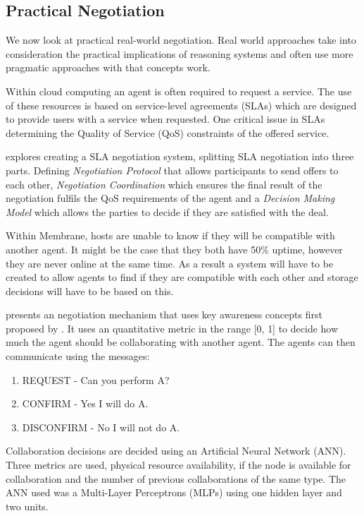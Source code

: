 \documentclass[11pt, a4paper, twoside]{report}
\begin{document}
\subsection{Practical Negotiation}

We now look at practical real-world negotiation. Real world approaches take into consideration the practical implications of reasoning systems and often use more pragmatic approaches with that concepts work.

Within cloud computing an agent is often required to request a service. The use of these resources is based on service-level agreements (SLAs) which are designed to provide users with a service when requested. \citep{paletta2009mas} One critical issue in SLAs determining the Quality of Service (QoS) constraints of the offered service.

\cite{yan2007autonomous} explores creating a SLA negotiation system, splitting SLA negotiation into three parts. Defining \emph{Negotiation Protocol} that allows participants to send offers to each other, \emph{Negotiation Coordination} which ensures the final result of the negotiation fulfils the QoS requirements of the agent and a \emph{Decision Making Model} which allows the parties to decide if they are satisfied with the deal.

Within Membrane, hosts are unable to know if they will be compatible with another agent. It might be the case that they both have 50\% uptime, however they are never online at the same time. As a result a system will have to be created to allow agents to find if they are compatible with each other and storage decisions will have to be based on this.

\cite{paletta2009mas} presents an negotiation mechanism that uses key awareness concepts first proposed by \cite{herrero2007agents}. It uses an quantitative metric in the range [0, 1] to decide how much the agent should be collaborating with another agent. The agents can then communicate using the messages:

\begin{enumerate}
 \item REQUEST - Can you perform A?
 \item CONFIRM - Yes I will do A.
 \item DISCONFIRM - No I will not do A.
\end{enumerate}

Collaboration decisions are decided using an Artificial Neural Network (ANN). Three metrics are used, physical resource availability, if the node is available for collaboration and the number of previous collaborations of the same type. The ANN used was a Multi-Layer Perceptrons (MLPs) using one hidden layer and two units.
\end{document}
